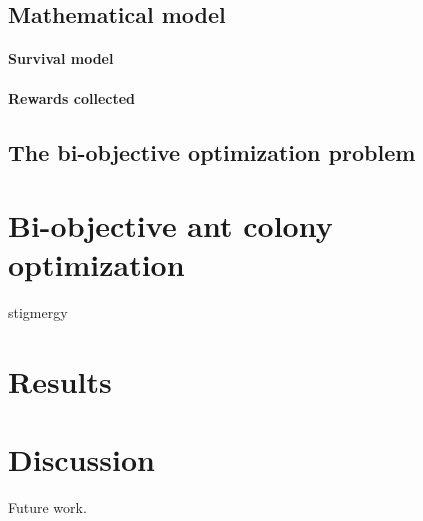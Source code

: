\documentclass[11pt, oneside]{article}
\begin{document}
\subsection{Mathematical model}

\paragraph{Survival model}

\paragraph{Rewards collected}

\subsection{The bi-objective optimization problem}

\section{Bi-objective ant colony optimization}
stigmergy

\section{Results}


\section{Discussion}

Future work.




\end{document}
